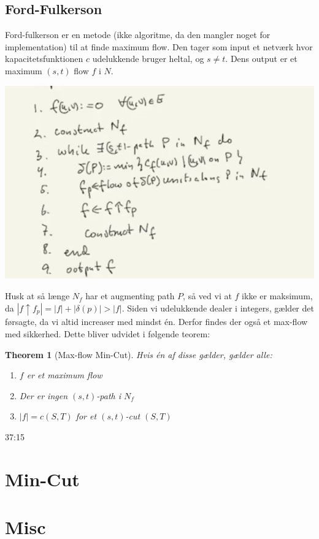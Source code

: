 \documentclass[11pt]{article}
\newtheorem{theorem}{Theorem}
\theoremstyle{definition}
\theoremstyle{remark}
\begin{document}
\subsection{Ford-Fulkerson}
\label{subsec:fordfulkerson}

Ford-fulkerson er en metode (ikke algoritme, da den mangler noget for implementation) til at finde maximum flow. Den tager som input et netværk hvor kapacitetsfunktionen $c$ udelukkende bruger heltal, og $s \neq t$. Dens output er et maximum $(s,t)$ flow $f$ i $N$.

\begin{center}
\includegraphics[scale=0.5]{ff.png}
\end{center}

Husk at så længe $N_{f}$ har et augmenting path $P$, så ved vi at $f$ ikke er maksimum, da $|f \uparrow f_{p}| = |f| + |\delta(p)| > |f|$.
Siden vi udelukkende dealer i integers, gælder det førsagte, da vi altid increaser med mindst én. Derfor findes der også et max-flow med sikkerhed. Dette bliver udvidet i følgende teorem:

\begin{theorem}[Max-flow Min-Cut]
  Hvis én af disse gælder, gælder alle:
  \begin{enumerate}
  \item[(1)]\label{item:1} $f$ er et maximum flow
  \item[(2)]\label{item:2} Der er ingen $(s,t)$-path i $N_{f}$
  \item[(3)]\label{item:3}  $|f| = c(S,T)$ for et $(s,t)$-cut $(S,T)$
  \end{enumerate}
\end{theorem}

37:15




\section{Min-Cut}
\label{sec:mincut}

\section{Misc}
\label{sec:misc}
\end{document}
